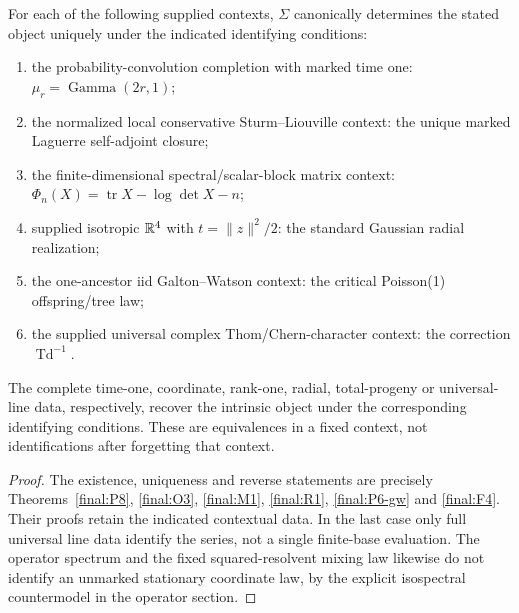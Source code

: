 \begin{theorem}
\label{final:global-E}
For each of the following supplied contexts, $\Sigma$ canonically determines
the stated object uniquely under the indicated identifying conditions:
\begin{enumerate}
\item the probability-convolution completion with marked time one:
      $\mu_r=\operatorname{Gamma}(2r,1)$;
\item the normalized local conservative Sturm--Liouville context:
      the unique marked Laguerre self-adjoint closure;
\item the finite-dimensional spectral/scalar-block matrix context:
      $\Phi_n(X)=\operatorname{tr}X-\log\det X-n$;
\item supplied isotropic $\mathbb R^4$ with $t=\|z\|^2/2$:
      the standard Gaussian radial realization;
\item the one-ancestor iid Galton--Watson context:
      the critical Poisson(1) offspring/tree law;
\item the supplied universal complex Thom/Chern-character context:
      the correction $\operatorname{Td}^{-1}$.
\end{enumerate}
The complete time-one, coordinate, rank-one, radial, total-progeny or
universal-line data, respectively, recover the intrinsic object under
the corresponding identifying conditions. These are equivalences in a
fixed context, not identifications after forgetting that context.
\end{theorem}
\begin{proof}
The existence, uniqueness and reverse statements are precisely
Theorems~\ref{final:P8}, \ref{final:O3}, \ref{final:M1},
\ref{final:R1}, \ref{final:P6-gw} and \ref{final:F4}.
Their proofs retain the indicated contextual data. In the last case only
full universal line data identify the series, not a single finite-base
evaluation. The operator spectrum and the fixed squared-resolvent
mixing law likewise do not identify an unmarked stationary coordinate
law, by the explicit isospectral countermodel in the operator section.
\end{proof}

